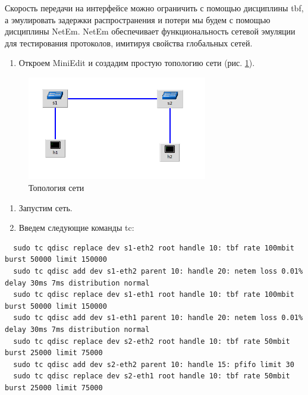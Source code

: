 \documentclass[
  13pt,
  fontsize=13pt,
  russian,
  a4paper,
,captions=tableheading
]{scrreprt}
\providecommand{\tightlist}{%
  \setlength{\itemsep}{0pt}\setlength{\parskip}{0pt}}
\begin{document}
Скорость передачи на интерфейсе можно ограничить с помощью дисциплины
tbf, а эмулировать задержки распространения и потери мы будем с помощью
дисциплины NetEm. NetEm обеспечивает функциональность сетевой эмуляции
для тестирования протоколов, имитируя свойства глобальных сетей.

\begin{enumerate}
\def\labelenumi{\arabic{enumi}.}
\tightlist
\item
  Откроем MiniEdit и создадим простую топологию сети (рис.
  \ref{fig:0030}).
\end{enumerate}

\begin{figure}
\hypertarget{fig:0030}{%
\centering
\includegraphics[width=0.7\textwidth,height=\textheight]{iproute_net_topo.png}
\caption{Топология сети}\label{fig:0030}
}
\end{figure}

\begin{enumerate}
\def\labelenumi{\arabic{enumi}.}
\setcounter{enumi}{1}
\tightlist
\item
  Запустим сеть.
\item
  Введем следующие команды tc:
\end{enumerate}

\begin{verbatim}
  sudo tc qdisc replace dev s1-eth2 root handle 10: tbf rate 100mbit burst 50000 limit 150000
  sudo tc qdisc add dev s1-eth2 parent 10: handle 20: netem loss 0.01% delay 30ms 7ms distribution normal
  sudo tc qdisc replace dev s1-eth1 root handle 10: tbf rate 100mbit burst 50000 limit 150000
  sudo tc qdisc add dev s1-eth1 parent 10: handle 20: netem loss 0.01% delay 30ms 7ms distribution normal
  sudo tc qdisc replace dev s2-eth2 root handle 10: tbf rate 50mbit burst 25000 limit 75000
  sudo tc qdisc add dev s2-eth2 parent 10: handle 15: pfifo limit 30
  sudo tc qdisc replace dev s2-eth1 root handle 10: tbf rate 50mbit burst 25000 limit 75000
  \end{verbatim}
\end{document}
